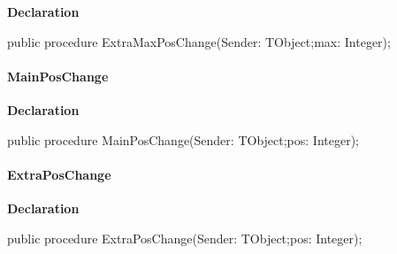 \documentclass{report}
\newif\ifpdf
\begin{document}
\label{igobase.TIWizFrm-ExtraMaxPosChange}
\begin{list}{}{
\setlength{\itemindent}{0cm}
\setlength{\listparindent}{0cm}
\setlength{\leftmargin}{\evensidemargin}
\addtolength{\leftmargin}{\tmplength}
\settowidth{\labelsep}{X}
\addtolength{\leftmargin}{\labelsep}
\setlength{\labelwidth}{\tmplength}
}
\item[\textbf{Declaration}\hfill]
\ifpdf
\begin{flushleft}
\fi
\begin{ttfamily}
public procedure ExtraMaxPosChange(Sender: TObject;max: Integer);\end{ttfamily}

\ifpdf
\end{flushleft}
\fi

\end{list}
\paragraph*{MainPosChange}\hspace*{\fill}

\label{igobase.TIWizFrm-MainPosChange}
\begin{list}{}{
\setlength{\itemindent}{0cm}
\setlength{\listparindent}{0cm}
\setlength{\leftmargin}{\evensidemargin}
\addtolength{\leftmargin}{\tmplength}
\settowidth{\labelsep}{X}
\addtolength{\leftmargin}{\labelsep}
\setlength{\labelwidth}{\tmplength}
}
\item[\textbf{Declaration}\hfill]
\ifpdf
\begin{flushleft}
\fi
\begin{ttfamily}
public procedure MainPosChange(Sender: TObject;pos: Integer);\end{ttfamily}

\ifpdf
\end{flushleft}
\fi

\end{list}
\paragraph*{ExtraPosChange}\hspace*{\fill}

\label{igobase.TIWizFrm-ExtraPosChange}
\begin{list}{}{
\setlength{\itemindent}{0cm}
\setlength{\listparindent}{0cm}
\setlength{\leftmargin}{\evensidemargin}
\addtolength{\leftmargin}{\tmplength}
\settowidth{\labelsep}{X}
\addtolength{\leftmargin}{\labelsep}
\setlength{\labelwidth}{\tmplength}
}
\item[\textbf{Declaration}\hfill]
\ifpdf
\begin{flushleft}
\fi
\begin{ttfamily}
public procedure ExtraPosChange(Sender: TObject;pos: Integer);\end{ttfamily}

\ifpdf
\end{flushleft}
\fi

\end{list}
\end{document}
